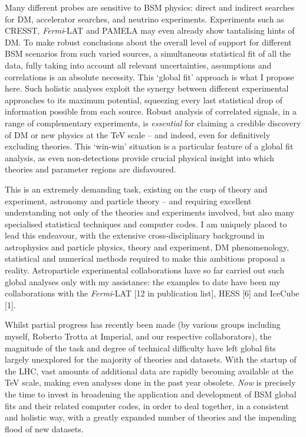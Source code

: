 \documentclass[11pt,oneside,twocolumn,a4paper]{article}
\begin{document}
Many different probes are sensitive to BSM physics: direct and indirect searches for DM, accelerator searches, and neutrino experiments.  Experiments such as CRESST, \emph{Fermi}-LAT and PAMELA may even already show tantalising hints of DM.  To make robust conclusions about the overall level of support for different BSM scenarios from such varied sources, a simultaneous statistical fit of all the data, fully taking into account all relevant uncertainties, assumptions and correlations is an absolute necessity.  This `global fit' approach is what I propose here.  Such holistic analyses exploit the synergy between different experimental approaches to its maximum potential, squeezing every last statistical drop of information possible from each source.  Robust analysis of correlated signals, in a range of complementary experiments, is \textit{essential} for claiming a credible discovery of DM or new physics at the TeV scale -- and indeed, even for definitively excluding theories.  This `win-win' situation is a particular feature of a global fit analysis, as even non-detections provide crucial physical insight into which theories and parameter regions are disfavoured.

This is an extremely demanding task, existing on the cusp of theory and experiment, astronomy and particle theory -- and requiring excellent understanding not only of the theories and experiments involved, but also many specialised statistical techniques and computer codes.  I am uniquely placed to lead this endeavour, with the extensive cross-disciplinary background in astrophysics and particle physics, theory and experiment, DM phenomenology, statistical and numerical methods required to make this ambitious proposal a reality.  Astroparticle experimental collaborations have so far carried out such global analyses only with my assistance: the examples to date have been my collaborations with the \emph{Fermi}-LAT [12 in publication list], HESS [6] and IceCube [1].

Whilst partial progress has recently been made (by various groups including myself, Roberto Trotta at Imperial, and our respective collaborators), the magnitude of the task and degree of technical difficulty have left global fits largely unexplored for the majority of theories and datasets.  With the startup of the LHC, vast amounts of additional data are rapidly becoming available at the TeV scale, making even analyses done in the past year obsolete.  \textit{Now} is precisely the time to invest in broadening the application and development of BSM global fits and their related computer codes, in order to deal together, in a consistent and holistic way, with a greatly expanded number of theories and the impending flood of new datasets.
\end{document}
